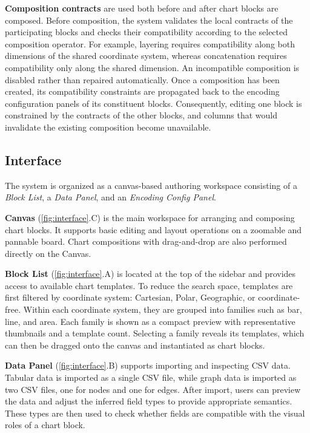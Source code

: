 \textbf{Composition contracts} are used both before and after chart blocks are
composed. Before composition, the system validates the local contracts of the
participating blocks and checks their compatibility according to the selected
composition operator. For example, layering requires compatibility along both
dimensions of the shared coordinate system, whereas concatenation requires
compatibility only along the shared dimension. An incompatible composition is
disabled rather than repaired automatically. Once a composition has been
created, its compatibility constraints are propagated back to the encoding
configuration panels of its constituent blocks. Consequently, editing one
block is constrained by the contracts of the other blocks, and columns that
would invalidate the existing composition become unavailable. 



\subsection{Interface}
\label{sec:interface}


The system is organized as a canvas-based authoring workspace consisting of a
\emph{Block List}, a \emph{Data Panel}, and an \emph{Encoding Config Panel}.

\textbf{Canvas} (\autoref{fig:interface}.C) is the main workspace for arranging and composing chart blocks.
It supports basic editing and layout operations on a zoomable and pannable
board. Chart compositions with drag-and-drop are also performed directly on the Canvas.


\textbf{Block List} (\autoref{fig:interface}.A) is located at the top of the sidebar and provides access
to available chart templates. To reduce the search space, templates are first
filtered by coordinate system: Cartesian, Polar, Geographic, or
coordinate-free. Within each coordinate system, they are grouped into
families such as bar, line, and area. Each family is shown as a compact
preview with representative thumbnails and a template count. Selecting a
family reveals its templates, which can then be dragged onto the canvas and
instantiated as chart blocks.

\textbf{Data Panel} (\autoref{fig:interface}.B) supports importing and inspecting CSV data. Tabular data is
imported as a single CSV file, while graph data is imported as two CSV files,
one for nodes and one for edges. After import, users can preview the data and
adjust the inferred field types to provide appropriate semantics. These types
are then used to check whether fields are compatible with the visual roles of
a chart block.


